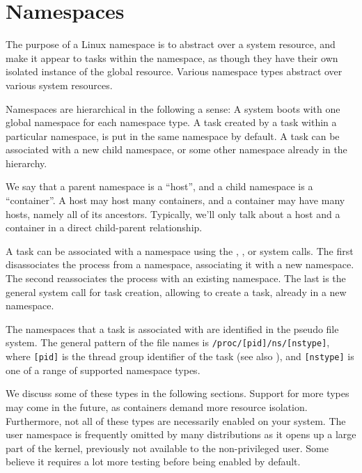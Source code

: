 
\section{Namespaces}

The purpose of a Linux namespace is to abstract over a system resource, and
make it appear to tasks within the namespace, as though they have their own
isolated instance of the global resource. Various namespace types abstract over
various system resources.

Namespaces are hierarchical in the following a sense: A system boots with one
global namespace for each namespace type. A task created by a task within a
particular namespace, is put in the same namespace by default. A task can be
associated with a new child namespace, or some other namespace already in the
hierarchy.

We say that a parent namespace is a ``host'', and a child namespace is a
``container''. A host may host many containers, and a container may have many
hosts, namely all of its ancestors. Typically, we'll only talk about a host and
a container in a direct child-parent relationship.

A task can be associated with a namespace using the \cite{man-2-unshare},
\cite{man-2-setns}, or \cite{man-2-clone} system calls. The first disassociates
the process from a namespace, associating it with a new namespace. The second
reassociates the process with an existing namespace. The last is the general
system call for task creation, allowing to create a task, already in a new
namespace.

The namespaces that a task is associated with are identified in the
\cite{man-5-proc} pseudo file system. The general pattern of the file names is
\texttt{/proc/[pid]/ns/[nstype]}, where \texttt{[pid]} is the thread group
identifier of the task (see also
), and \texttt{[nstype]} is one
of a range of supported namespace types.

We discuss some of these types in the following sections. Support for more
types may come in the future, as containers demand more resource isolation.
Furthermore, not all of these types are necessarily enabled on your system. The
user namespace is frequently omitted by many distributions as it opens up a
large part of the kernel, previously not available to the non-privileged user.
Some believe it requires a lot more testing before being enabled by default.

